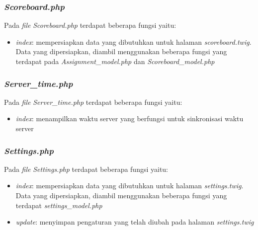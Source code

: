 \subsubsection{\textit{Scoreboard.php}}
Pada \textit{file} \textit{Scoreboard.php} terdapat beberapa fungsi yaitu:
\begin{itemize}
	\item \textit{index}: mempersiapkan data yang dibutuhkan untuk halaman \textit{scoreboard.twig}. Data yang dipersiapkan, diambil menggunakan beberapa fungsi yang terdapat pada \textit{Assignment\_model.php} dan \textit{Scoreboard\_model.php}
\end{itemize}

\subsubsection{\textit{Server\_time.php}}
Pada \textit{file} \textit{Server\_time.php} terdapat beberapa fungsi yaitu:
\begin{itemize}
	\item \textit{index}: menampilkan waktu server yang berfungsi untuk sinkronisasi waktu server
\end{itemize}

\subsubsection{\textit{Settings.php}}
Pada \textit{file} \textit{Settings.php} terdapat beberapa fungsi yaitu:
\begin{itemize}
	\item \textit{index}: mempersiapkan data yang dibutuhkan untuk halaman \textit{settings.twig}. Data yang dipersiapkan, diambil menggunakan beberapa fungsi yang terdapat \textit{settings\_model.php}
	\item \textit{update}: menyimpan pengaturan yang telah diubah pada halaman \textit{settings.twig}
\end{itemize}

